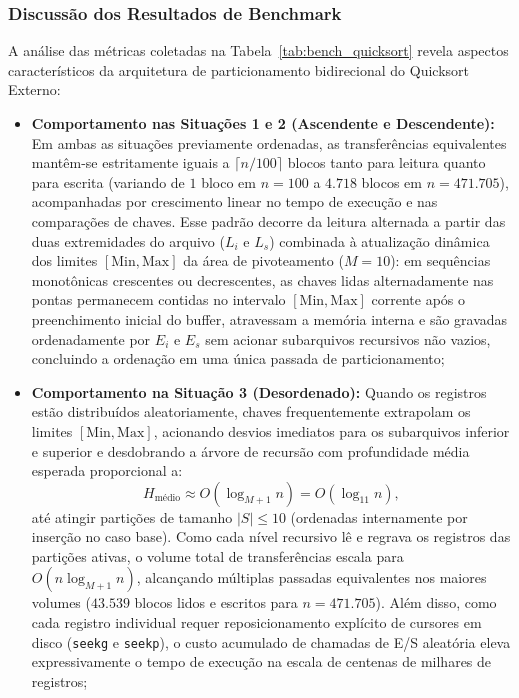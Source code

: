 \documentclass[12pt,a4paper]{article}
\begin{document}
\subsubsection{Discussão dos Resultados de Benchmark}
A análise das métricas coletadas na Tabela~\ref{tab:bench_quicksort} revela aspectos característicos da arquitetura de particionamento bidirecional do Quicksort Externo:
\begin{itemize}
    \item \textbf{Comportamento nas Situações 1 e 2 (Ascendente e Descendente):} Em ambas as situações previamente ordenadas, as transferências equivalentes mantêm-se estritamente iguais a $\lceil n / 100 \rceil$ blocos tanto para leitura quanto para escrita (variando de $1$ bloco em $n = 100$ a $4.718$ blocos em $n = 471.705$), acompanhadas por crescimento linear no tempo de execução e nas comparações de chaves. Esse padrão decorre da leitura alternada a partir das duas extremidades do arquivo ($L_i$ e $L_s$) combinada à atualização dinâmica dos limites $[\text{Min}, \text{Max}]$ da área de pivoteamento ($M = 10$): em sequências monotônicas crescentes ou decrescentes, as chaves lidas alternadamente nas pontas permanecem contidas no intervalo $[\text{Min}, \text{Max}]$ corrente após o preenchimento inicial do buffer, atravessam a memória interna e são gravadas ordenadamente por $E_i$ e $E_s$ sem acionar subarquivos recursivos não vazios, concluindo a ordenação em uma única passada de particionamento;
    \item \textbf{Comportamento na Situação 3 (Desordenado):} Quando os registros estão distribuídos aleatoriamente, chaves frequentemente extrapolam os limites $[\text{Min}, \text{Max}]$, acionando desvios imediatos para os subarquivos inferior e superior e desdobrando a árvore de recursão com profundidade média esperada proporcional a:
    \begin{equation}
        H_{\text{médio}} \approx O(\log_{M+1} n) = O(\log_{11} n),
    \end{equation}
    até atingir partições de tamanho $|S| \le 10$ (ordenadas internamente por inserção no caso base). Como cada nível recursivo lê e regrava os registros das partições ativas, o volume total de transferências escala para $O(n \log_{M+1} n)$, alcançando múltiplas passadas equivalentes nos maiores volumes ($43.539$ blocos lidos e escritos para $n = 471.705$). Além disso, como cada registro individual requer reposicionamento explícito de cursores em disco (\texttt{seekg} e \texttt{seekp}), o custo acumulado de chamadas de E/S aleatória eleva expressivamente o tempo de execução na escala de centenas de milhares de registros;

\end{itemize}
\end{document}
